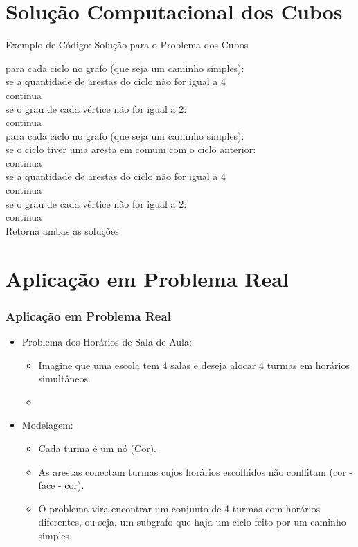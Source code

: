 \documentclass{beamer}
\begin{document}
\section{Solução Computacional dos Cubos}

\begin{frame}{Exemplo de Código: Solução para o Problema dos Cubos}

para cada ciclo no grafo (que seja um caminho simples):\\
\quad se a quantidade de arestas do ciclo não for igual a 4\\ 
\quad\quad continua\\
\quad se o grau de cada vértice não for igual a 2:\\
\quad\quad continua\\

\quad para cada ciclo no grafo (que seja um caminho simples):\\
\quad\quad se o ciclo tiver uma aresta em comum com o ciclo anterior:\\
\quad\quad\quad continua\\
\quad\quad se a quantidade de arestas do ciclo não for igual a 4\\ 
\quad\quad\quad continua\\
\quad\quad se o grau de cada vértice não for igual a 2:\\
\quad\quad\quad continua\\
\quad\quad Retorna ambas as soluções\\

\end{frame}

\section{Aplicação em Problema Real}

\begin{frame}
\frametitle{Aplicação em Problema Real}

\begin{itemize}
  \item Problema dos Horários de Sala de Aula:
  \begin{itemize}
    \item Imagine que uma escola tem 4 salas e deseja alocar 4 turmas em horários simultâneos.
    \item 
  \end{itemize}
  \item Modelagem:
  \begin{itemize}
    \item Cada turma é um nó (Cor).
    \item As arestas conectam turmas cujos horários escolhidos não conflitam (cor - face - cor).
    \item O problema vira encontrar um conjunto de 4 turmas com horários diferentes, ou seja, um subgrafo que haja um ciclo feito por um caminho simples.
  \end{itemize}
\end{itemize}

\end{frame}
\end{document}
